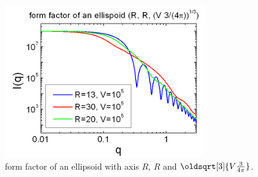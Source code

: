 \begin{figure}[htb]
\begin{center}
\includegraphics[width=0.768\textwidth,height=0.588\textwidth]{../images/form_factor/Ellipsoid/ellipsoid_i.png}
\end{center}
\caption{form factor of an ellipsoid with axis $R$, $R$ and
$\oldsqrt[3]{V\frac{3}{4\pi}}$.} \label{fig:I_ellipsoid_i}
\end{figure}

\clearpage
